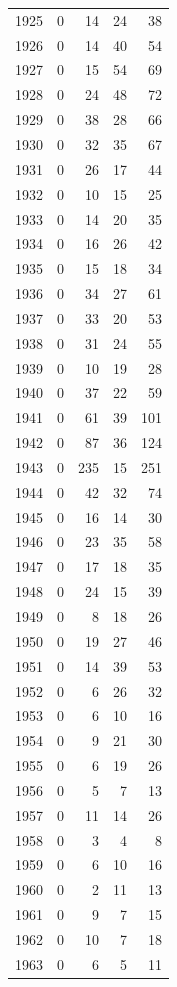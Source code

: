 \documentclass[
]{article}
\begin{document}
\begin{longtable}{rrrrr}
1925 & 0 & 14 & 24 & 38 \\ 
1926 & 0 & 14 & 40 & 54 \\ 
1927 & 0 & 15 & 54 & 69 \\ 
1928 & 0 & 24 & 48 & 72 \\ 
1929 & 0 & 38 & 28 & 66 \\ 
1930 & 0 & 32 & 35 & 67 \\ 
1931 & 0 & 26 & 17 & 44 \\ 
1932 & 0 & 10 & 15 & 25 \\ 
1933 & 0 & 14 & 20 & 35 \\ 
1934 & 0 & 16 & 26 & 42 \\ 
1935 & 0 & 15 & 18 & 34 \\ 
1936 & 0 & 34 & 27 & 61 \\ 
1937 & 0 & 33 & 20 & 53 \\ 
1938 & 0 & 31 & 24 & 55 \\ 
1939 & 0 & 10 & 19 & 28 \\ 
1940 & 0 & 37 & 22 & 59 \\ 
1941 & 0 & 61 & 39 & 101 \\ 
1942 & 0 & 87 & 36 & 124 \\ 
1943 & 0 & 235 & 15 & 251 \\ 
1944 & 0 & 42 & 32 & 74 \\ 
1945 & 0 & 16 & 14 & 30 \\ 
1946 & 0 & 23 & 35 & 58 \\ 
1947 & 0 & 17 & 18 & 35 \\ 
1948 & 0 & 24 & 15 & 39 \\ 
1949 & 0 & 8 & 18 & 26 \\ 
1950 & 0 & 19 & 27 & 46 \\ 
1951 & 0 & 14 & 39 & 53 \\ 
1952 & 0 & 6 & 26 & 32 \\ 
1953 & 0 & 6 & 10 & 16 \\ 
1954 & 0 & 9 & 21 & 30 \\ 
1955 & 0 & 6 & 19 & 26 \\ 
1956 & 0 & 5 & 7 & 13 \\ 
1957 & 0 & 11 & 14 & 26 \\ 
1958 & 0 & 3 & 4 & 8 \\ 
1959 & 0 & 6 & 10 & 16 \\ 
1960 & 0 & 2 & 11 & 13 \\ 
1961 & 0 & 9 & 7 & 15 \\ 
1962 & 0 & 10 & 7 & 18 \\ 
1963 & 0 & 6 & 5 & 11 \\ 

\end{longtable}
\end{document}
